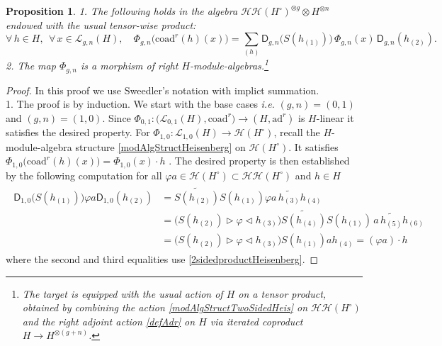 \documentclass[11pt]{amsart}
\newtheorem{prop}[teo]{Proposition}
\begin{document}
\begin{prop}\label{propAlekseevMorph}
1. The following holds in the algebra $\mathcal{HH}(H^\circ)^{\otimes g} \otimes H^{\otimes n}$ endowed with the usual tensor-wise product:
\[ \forall \, h \in H, \:\: \forall \, x \in \mathcal{L}_{g,n}(H), \quad \Phi_{g,n}\bigl( \mathrm{coad}^r(h)(x) \bigr) = \sum_{(h)} \mathsf{D}_{g,n}\bigl( S(h_{(1)}) \bigr) \, \Phi_{g,n}(x) \, \mathsf{D}_{g,n}(h_{(2)}). \]
2. The map $\Phi_{g,n}$ is a morphism of right $H$-module-algebras.\footnote{The target is equipped with the usual action of $H$ on a tensor product, obtained by combining the action \eqref{modAlgStructTwoSidedHeis} on $\mathcal{HH}(H^\circ)$ and the right adjoint action \eqref{defAdr} on $H$ {\it via} iterated coproduct $H \to H^{\otimes (g+n)}$.} 
\end{prop}
\begin{proof}
In this proof we use Sweedler's notation with implict summation.
\\1. The proof is by induction. We start with the base cases \textit{i.e.} $(g,n) = (0,1)$ and $(g,n)=(1,0)$. Since $\Phi_{0,1}:\bigl( \mathcal{L}_{0,1}(H), \mathrm{coad}^r \bigr) \to (H,\mathrm{ad}^r)$ is $H$-linear it satisfies the desired property. For $\Phi_{1,0} : \mathcal{L}_{1,0}(H) \to \mathcal{H}(H^\circ)$, recall the $H$-module-algebra structure \eqref{modAlgStructHeisenberg} on $\mathcal{H}(H^\circ)$. It satisfies $\Phi_{1,0}\bigl( \mathrm{coad}^r(h)(x) \bigr) = \Phi_{1,0}(x) \cdot h$ \cite[\S 3.3]{BFR}. The desired property is then established by the following computation for all $\varphi a \in \mathcal{H}(H^\circ) \subset \mathcal{HH}(H^\circ)$ and $h \in H$
\begin{align}
\begin{split}\label{QMMHeisDansPreuve}
\mathsf{D}_{1,0}\bigl( S(h_{(1)}) \bigr) \varphi a \mathsf{D}_{1,0}(h_{(2)}) &=  \widetilde{S(h_{(2)})} S(h_{(1)}) \varphi a \, \widetilde{h_{(3)}} h_{(4)}\\
&=\bigl( S(h_{(2)}) \rhd \varphi \lhd h_{(3)} \bigr) \widetilde{S(h_{(4)})} S(h_{(1)}) \, a\, \widetilde{h_{(5)}} h_{(6)}\\
&= \bigl( S(h_{(2)}) \rhd \varphi \lhd h_{(3)} \bigr) S(h_{(1)}) a h_{(4)} = (\varphi a) \cdot h
\end{split}
\end{align}
where the second and third equalities use \eqref{2sidedproductHeisenberg}.


\end{proof}
\end{document}
